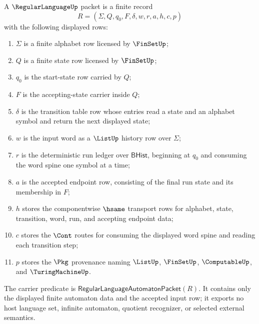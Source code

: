 \begin{definition}
\label{def:regularlanguage-finite-automaton-carrier}
A $\RegularLanguageUp$ packet is a finite record
$$
R=(\Sigma,Q,q_0,F,\delta,w,r,a,h,c,p)
$$
with the following displayed rows:
\begin{enumerate}
\item $\Sigma$ is a finite alphabet row licensed by $\FinSetUp$;
\item $Q$ is a finite state row licensed by $\FinSetUp$;
\item $q_0$ is the start-state row carried by $Q$;
\item $F$ is the accepting-state carrier inside $Q$;
\item $\delta$ is the transition table row whose entries read a state and an
alphabet symbol and return the next displayed state;
\item $w$ is the input word as a $\ListUp$ history row over $\Sigma$;
\item $r$ is the deterministic run ledger over $\mathsf{BHist}$, beginning at
$q_0$ and consuming the word spine one symbol at a time;
\item $a$ is the accepted endpoint row, consisting of the final run state and
its membership in $F$;
\item $h$ stores the componentwise $\hsame$ transport rows for alphabet,
state, transition, word, run, and accepting endpoint data;
\item $c$ stores the $\Cont$ routes for consuming the displayed word spine and
reading each transition step;
\item $p$ stores the $\Pkg$ provenance naming $\ListUp$, $\FinSetUp$,
$\ComputableUp$, and $\TuringMachineUp$.
\end{enumerate}
The carrier predicate is
$\mathsf{RegularLanguageAutomatonPacket}(R)$. It contains only the displayed
finite automaton data and the accepted input row; it exports no host language
set, infinite automaton, quotient recognizer, or selected external semantics.
\end{definition}

